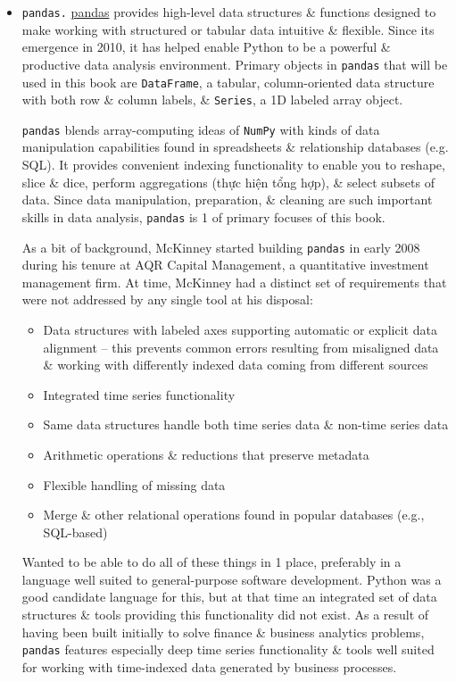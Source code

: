 \documentclass{article}
\begin{document}
\begin{itemize}
\begin{itemize}
\begin{itemize}
			\item {\tt pandas.} \href{https://pandas.pydata.org}{pandas} provides high-level data structures \& functions designed to make working with structured or tabular data intuitive \& flexible. Since its emergence in 2010, it has helped enable Python to be a powerful \& productive data analysis environment. Primary objects in {\tt pandas} that will be used in this book are {\tt DataFrame}, a tabular, column-oriented data structure with both row \& column labels, \& {\tt Series}, a 1D labeled array object.
			
			{\tt pandas} blends array-computing ideas of {\tt NumPy} with kinds of data manipulation capabilities found in spreadsheets \& relationship databases (e.g. SQL). It provides convenient indexing functionality to enable you to reshape, slice \& dice, perform aggregations (thực hiện tổng hợp), \& select subsets of data. Since data manipulation, preparation, \& cleaning are such important skills in data analysis, {\tt pandas} is 1 of primary focuses of this book.
			
			As a bit of background, {\sc McKinney} started building {\tt pandas} in early 2008 during his tenure at AQR Capital Management, a quantitative investment management firm. At time, {\sc McKinney} had a distinct set of requirements that were not addressed by any single tool at his disposal:
			\begin{itemize}
				\item Data structures with labeled axes supporting automatic or explicit data alignment -- this prevents common errors resulting from misaligned data \& working with differently indexed data coming from different sources
				\item Integrated time series functionality
				\item Same data structures handle both time series data \& non-time series data
				\item Arithmetic operations \& reductions that preserve metadata
				\item Flexible handling of missing data
				\item Merge \& other relational operations found in popular databases (e.g., SQL-based)
			\end{itemize}
			Wanted to be able to do all of these things in 1 place, preferably in a language well suited to general-purpose software development. Python was a good candidate language for this, but at that time an integrated set of data structures \& tools providing this functionality did not exist. As a result of having been built initially to solve finance \& business analytics problems, {\tt pandas} features especially deep time series functionality \& tools well suited for working with time-indexed data generated by business processes.
			

\end{itemize}
\end{itemize}
\end{itemize}
\end{document}
